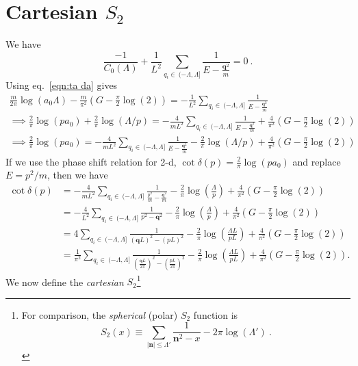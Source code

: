 \section{Cartesian $S_2$}
We have
\begin{equation}
 \frac{-1}{C_{0}(\Lambda)}+\frac{1}{L^2}\sum_{q_i\in\ (-\Lambda,\Lambda]}\frac { 1 } { E - \frac{\bm{q}^2}{m} }=0\ .
 \end{equation}
 Using eq.~\eqref{eqn:ta da} gives
\begin{multline}
\frac{m}{2\pi}\log\left(a_0\Lambda\right)-\frac{m}{\pi^2}\left(G-\frac{\pi }{2}\log(2)\right)=-\frac{1}{L^2}\sum_{q_i\in\ (-\Lambda,\Lambda]} \frac { 1 } { E - \frac{\bm{q}^2}{m} }\\
\implies
\frac{2}{\pi}\log (pa_0)+\frac{2}{\pi}\log(\Lambda/p)=-\frac{4}{mL^2}\sum_{q_i\in\ (-\Lambda,\Lambda]}  \frac { 1 } { E - \frac{\bm{q}^2}{m} }+\frac{4}{\pi^2}\left(G-\frac{\pi}{2}\log(2)\right)\\
\implies
\frac{2}{\pi}\log (pa_0)=-\frac{4}{mL^2}\sum_{q_i\in\ (-\Lambda,\Lambda]}  \frac { 1 } { E - \frac{\bm{q}^2}{m} }-\frac{2}{\pi}\log(\Lambda/p)+\frac{4}{\pi^2}\left(G-\frac{\pi}{2}\log(2)\right)
\end{multline}
If we use the phase shift relation for 2-d, $\cot\delta(p)=\frac{2}{\pi}\log (pa_0)$ and replace $E=p^2/m$, then we have
\begin{align}
\cot\delta(p)&=-\frac{4}{mL^2}\sum_{q_i\in\ (-\Lambda,\Lambda]}  \frac { 1 } { \frac{p^2}{m} - \frac{\bm{q}^2}{m} }-\frac{2}{\pi}\log\left(\frac{\Lambda}{p}\right)+\frac{4}{\pi^2}\left(G-\frac{\pi }{2}\log(2)\right)\\
&=-\frac{4}{L^2}\sum_{q_i\in\ (-\Lambda,\Lambda]}  \frac { 1 } {p^2 - \bm{q}^2 }-\frac{2}{\pi}\log\left(\frac{\Lambda}{p}\right)+\frac{4}{\pi^2}\left(G-\frac{\pi }{2}\log(2)\right)\\
&=4\sum_{q_i\in\ (-\Lambda,\Lambda]}  \frac { 1 } {(\bm{q}L)^2-(pL)^2 }-\frac{2}{\pi}\log\left(\frac{\Lambda L}{pL}\right)+\frac{4}{\pi^2}\left(G-\frac{\pi }{2}\log(2)\right)\\
&=\frac{1}{\pi^2}\sum_{q_i\in\ (-\Lambda,\Lambda]}  \frac { 1 } {\left(\frac{\bm{q}L}{2\pi}\right)^2-\left(\frac{pL}{2\pi}\right)^2 }-\frac{2}{\pi}\log\left(\frac{\Lambda L}{pL}\right)+\frac{4}{\pi^2}\left(G-\frac{\pi }{2}\log(2)\right).
\end{align}
We now define the \emph{cartesian} $S_2$\label{eqn:S2}\footnote{For comparison, the \emph{spherical} (polar) $S_2$ function is
\begin{equation}\label{eqn:S2 polar}
S_2(x)\equiv\sum_{|\bm n|\le\Lambda'}\frac { 1 } { \bm{n}^2 -x}-2\pi\log\left(\Lambda'\right)\ .
\end{equation}}
